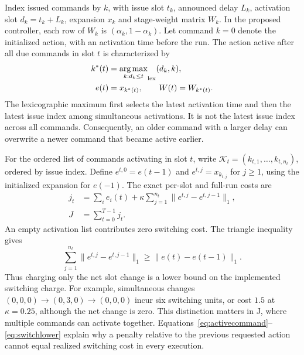 \documentclass{IEEEoj}
\begin{document}
Index issued commands by $k$, with issue slot $t_k$, announced delay $L_k$,
activation slot $d_k=t_k+L_k$, expansion $x_k$ and stage-weight matrix $W_k$.
In the proposed controller, each row of $W_k$ is
$(\alpha_k,1-\alpha_k)$. Let command $k=0$ denote the initialized action,
with an activation time before the run. The action active after all due
commands in slot $t$ is characterized by
\begin{equation}
\begin{aligned}
 k^*(t)&=\underset{k:d_k\le t}{\arg\max}_{\rm lex}(d_k,k),\\
 e(t)&=x_{k^*(t)},\qquad W(t)=W_{k^*(t)}.
\end{aligned}
\label{eq:activecommand}
\end{equation}
The lexicographic maximum first selects the latest activation time and then
the latest issue index among simultaneous activations. It is not the latest
issue index across all commands. Consequently, an older command with a larger
delay can overwrite a newer command that became active earlier.

For the ordered list of commands activating in slot $t$, write
$\mathcal K_t=(k_{t,1},\ldots,k_{t,n_t})$, ordered by issue index. Define
$e^{t,0}=e(t-1)$ and $e^{t,j}=x_{k_{t,j}}$ for $j\ge1$, using the initialized
expansion for $e(-1)$. The exact per-slot and full-run costs are
\begin{align}
 j_t&=\sum_i e_i(t)+\kappa\sum_{j=1}^{n_t}
       \|e^{t,j}-e^{t,j-1}\|_1,\label{eq:slotcost}\\
 J&=\sum_{t=0}^{T-1}j_t.\label{eq:commandsumcost}
\end{align}
An empty activation list contributes zero switching cost. The triangle
inequality gives
\begin{equation}
 \sum_{j=1}^{n_t}\|e^{t,j}-e^{t,j-1}\|_1
 \ge\|e(t)-e(t-1)\|_1.
 \label{eq:switchlower}
\end{equation}
Thus charging only the net slot change is a lower bound on the implemented
switching charge. For example, simultaneous changes
$(0,0,0)\rightarrow(0,3,0)\rightarrow(0,0,0)$ incur six switching units,
or cost $1.5$ at $\kappa=0.25$, although the net change is zero.
This distinction matters in J, where multiple commands can activate together.
Equations~\eqref{eq:activecommand}--\eqref{eq:switchlower} explain why a
penalty relative to the previous requested action cannot equal realized
switching cost in every execution.
\end{document}
